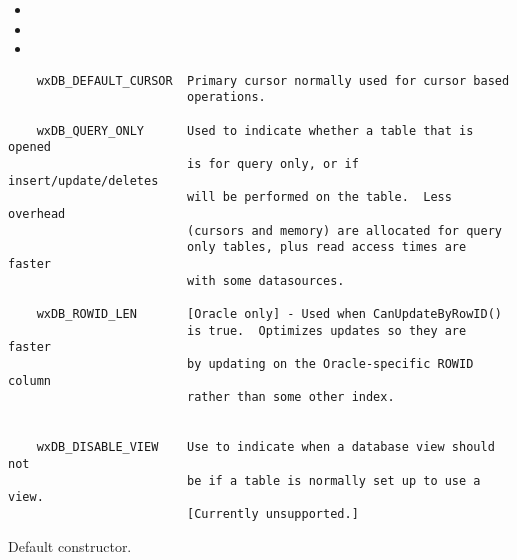 \begin{itemize}\itemsep=0pt
\item {}
\item {}
\item {}
\end{itemize}


\begin{verbatim}
    wxDB_DEFAULT_CURSOR  Primary cursor normally used for cursor based
                         operations.

    wxDB_QUERY_ONLY      Used to indicate whether a table that is opened
                         is for query only, or if insert/update/deletes
                         will be performed on the table.  Less overhead
                         (cursors and memory) are allocated for query
                         only tables, plus read access times are faster
                         with some datasources.

    wxDB_ROWID_LEN       [Oracle only] - Used when CanUpdateByRowID()
                         is true.  Optimizes updates so they are faster
                         by updating on the Oracle-specific ROWID column
                         rather than some other index.


    wxDB_DISABLE_VIEW    Use to indicate when a database view should not
                         be if a table is normally set up to use a view.
                         [Currently unsupported.]

\end{verbatim}



\label{wxdbtableconstr}


Default constructor.


